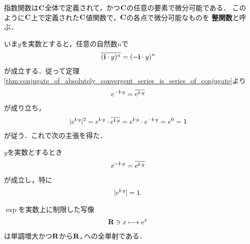 	指数関数は$\mathbf{C}$全体で定義されて，かつ$\mathbf{C}$の任意の要素で微分可能である．
	このように$\mathbf{C}$上で定義された$\mathbf{C}$値関数で，$\mathbf{C}$の各点で微分可能なものを
	{\bf 整関数}と呼ぶ．
	
	いま$y$を実数とすると，任意の自然数$n$で
	\begin{align}
		\overline{(\mathbf{i} \cdot y)^n} = (-\mathbf{i} \cdot y)^n
	\end{align}
	が成立する．従って定理\ref{thm:conjugate_of_absolutely_convergent_series_is_series_of_conjugate}より
	\begin{align}
		e^{-\mathbf{i} \cdot y} = \overline{e^{\mathbf{i} \cdot y}}
	\end{align}
	が成り立ち，
	\begin{align}
		|e^{\mathbf{i} \cdot y}|^2 
		= e^{\mathbf{i} \cdot y} \cdot \overline{e^{\mathbf{i} \cdot y}}
		= e^{\mathbf{i} \cdot y} \cdot e^{-\mathbf{i} \cdot y}
		= e^{0}
		= 1
	\end{align}
	が従う．これで次の主張を得た．
	
	\begin{screen}
		\begin{thm}[$e$の純虚数乗の絶対値は$1$]
			$y$を実数とするとき
			\begin{align}
				e^{-\mathbf{i} \cdot y} = \overline{e^{\mathbf{i} \cdot y}}
			\end{align}
			が成立し，特に
			\begin{align}
				|e^{\mathbf{i} \cdot y}| = 1.
			\end{align}
		\end{thm}
	\end{screen}
	
	\begin{screen}
		\begin{thm}[指数関数は実数上で単調増大かつ一対一対応]\label{thm:real_valued_exponential_function}
			$\exp$を実数上に制限した写像
			\begin{align}
				\mathbf{R} \ni x \longmapsto e^x
			\end{align}
			は単調増大かつ$\mathbf{R}$から$\mathbf{R}_+$への全単射である．
		\end{thm}
	\end{screen}
	
